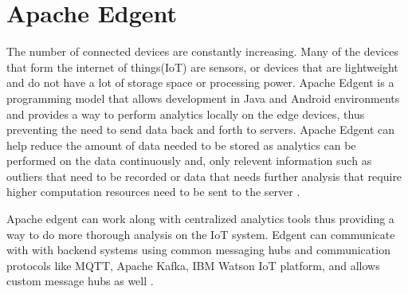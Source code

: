 \section{Apache Edgent}

The number of connected devices are constantly increasing.
Many of the devices that form the internet of things(IoT) are sensors,
or devices that are lightweight and do not have a lot of storage space
or processing power.
Apache Edgent is a programming model that allows development in Java and
Android environments and provides a way to perform analytics locally on
the edge devices, thus preventing the need to send data back and forth to
servers\cite{hid-sp18-503-edgent}. Apache Edgent can help reduce
the amount of data needed to be stored as analytics can be performed on
the data continuously and, only relevent information such as outliers
that need to be recorded or data that needs further analysis that require
higher computation resources need to be sent to the server
\cite{hid-sp18-503-edgent-docs}.

Apache edgent can work along with centralized analytics tools thus providing
a way to do more thorough analysis on the IoT system. Edgent can
communicate with with backend systems using common messaging hubs and
communication protocols like MQTT, Apache Kafka, IBM Watson IoT platform,
and allows custom message hubs as well \cite{hid-sp18-503-edgent-docs}.
